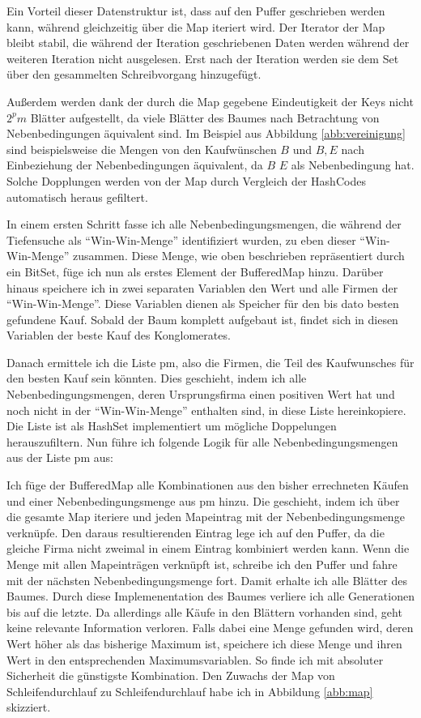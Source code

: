 Ein Vorteil dieser Datenstruktur ist, dass auf den Puffer geschrieben werden kann, während gleichzeitig über die Map iteriert wird. Der Iterator der Map bleibt stabil, die während der Iteration geschriebenen Daten werden während der weiteren Iteration nicht ausgelesen. Erst nach der Iteration werden sie dem Set über den gesammelten Schreibvorgang hinzugefügt.

Außerdem werden dank der durch die Map gegebene Eindeutigkeit der Keys nicht \(2^pm\) Blätter aufgestellt, da viele Blätter des Baumes nach Betrachtung von Nebenbedingungen äquivalent sind. Im Beispiel aus Abbildung \ref{abb:vereinigung} sind beispielsweise die Mengen von den Kaufwünschen \(B\) und \(B, E\) nach Einbeziehung der Nebenbedingungen äquivalent, da \(B\) \(E\) als Nebenbedingung hat. Solche Dopplungen werden von der Map durch Vergleich der HashCodes automatisch heraus gefiltert.

In einem ersten Schritt fasse ich alle Nebenbedingungsmengen, die während der Tiefensuche als "`Win-Win-Menge"' identifiziert wurden, zu eben dieser "`Win-Win-Menge"' zusammen. Diese Menge, wie oben beschrieben repräsentiert durch ein BitSet, füge ich nun als erstes Element der BufferedMap hinzu.
Darüber hinaus speichere ich in zwei separaten Variablen den Wert und alle Firmen der "`Win-Win-Menge"'. Diese Variablen dienen als Speicher für den bis dato besten gefundene Kauf. Sobald der Baum komplett aufgebaut ist, findet sich in diesen Variablen der beste Kauf des Konglomerates.

Danach ermittele ich die Liste pm, also die Firmen, die Teil des Kaufwunsches für den besten Kauf sein könnten. Dies geschieht, indem ich alle Nebenbedingungsmengen, deren Ursprungsfirma einen positiven Wert hat und noch nicht in der "`Win-Win-Menge"' enthalten sind, in diese Liste hereinkopiere. Die Liste ist als HashSet implementiert um mögliche Doppelungen herauszufiltern. Nun führe ich folgende Logik für alle Nebenbedingungsmengen aus der Liste pm aus:

Ich füge der BufferedMap alle Kombinationen aus den bisher errechneten Käufen und einer Nebenbedingungsmenge aus pm hinzu. Die geschieht, indem ich über die gesamte Map iteriere und jeden Mapeintrag mit der Nebenbedingungsmenge verknüpfe. Den daraus resultierenden Eintrag lege ich auf den Puffer, da die gleiche Firma nicht zweimal in einem Eintrag kombiniert werden kann. Wenn die Menge mit allen Mapeinträgen verknüpft ist, schreibe ich den Puffer und fahre mit der nächsten Nebenbedingungsmenge fort. Damit erhalte ich alle Blätter des Baumes. Durch diese Implemenentation des Baumes verliere ich alle Generationen bis auf die letzte. Da allerdings alle Käufe in den Blättern vorhanden sind, geht keine relevante Information verloren. Falls dabei eine Menge gefunden wird, deren Wert höher als das bisherige Maximum ist, speichere ich diese Menge und ihren Wert in den entsprechenden Maximumsvariablen. So finde ich mit absoluter Sicherheit die günstigste Kombination. Den Zuwachs der Map von Schleifendurchlauf zu Schleifendurchlauf habe ich in Abbildung \ref{abb:map} skizziert.

